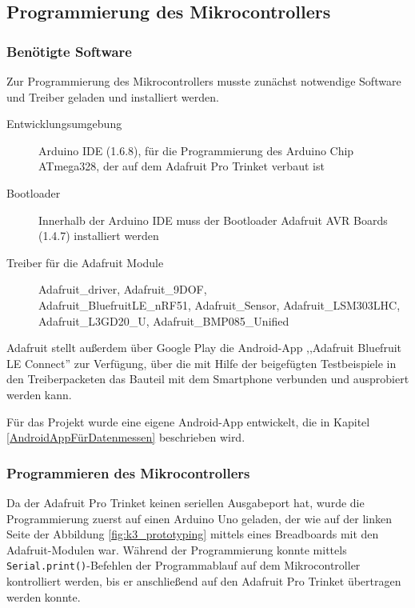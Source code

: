 \subsection{Programmierung des Mikrocontrollers}
\label{kapitel_programmierungMikrocontroller}
 
\subsubsection{Benötigte Software}

Zur Programmierung des Mikrocontrollers musste zunächst notwendige Software und Treiber geladen und installiert werden.

\begin{description}
	\item[Entwicklungsumgebung] Arduino IDE (1.6.8), für die Programmierung des Arduino Chip ATmega328, der auf dem Adafruit Pro Trinket verbaut ist
	\item[Bootloader] Innerhalb der Arduino IDE muss der Bootloader Adafruit AVR Boards (1.4.7) installiert werden
	\item[Treiber für die Adafruit Module] Adafruit\_driver, Adafruit\_9DOF, \\ Adafruit\_BluefruitLE\_nRF51, Adafruit\_Sensor, Adafruit\_LSM303LHC, \\ Adafruit\_L3GD20\_U, Adafruit\_BMP085\_Unified
\end{description}

Adafruit stellt außerdem über Google Play die Android-App ,,Adafruit Bluefruit LE Connect'' zur Verfügung, über die mit Hilfe der beigefügten Testbeispiele in den Treiberpacketen das Bauteil mit dem Smartphone verbunden und ausprobiert werden kann. 

Für das Projekt wurde eine eigene Android-App entwickelt, die in Kapitel \ref{AndroidAppFürDatenmessen} beschrieben wird.

\subsubsection{Programmieren des Mikrocontrollers}
Da der Adafruit Pro Trinket keinen seriellen Ausgabeport hat, wurde die Programmierung zuerst auf einen Arduino Uno geladen, der wie auf der linken Seite der Abbildung \ref{fig:k3_prototyping} mittels eines Breadboards mit den Adafruit-Modulen war. Während der Programmierung konnte mittels \texttt{Serial.print()}-Befehlen der Programmablauf auf dem Mikrocontroller kontrolliert werden, bis er anschließend auf den Adafruit Pro Trinket übertragen werden konnte.

